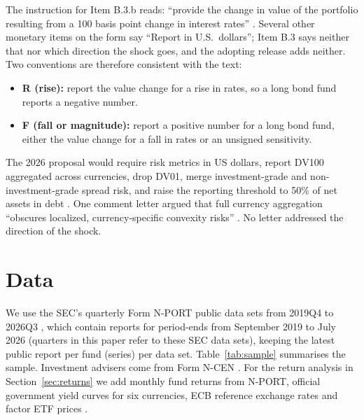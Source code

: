\documentclass[11pt]{article}
\begin{document}
The instruction for Item B.3.b reads: ``provide the change in value of the portfolio resulting from a
100 basis point change in interest rates'' \citep{sec_nport}. Several other monetary items on the form
say ``Report in U.S.\ dollars''; Item B.3 says neither that nor which direction the shock goes, and
the adopting release adds neither. Two conventions are therefore consistent with the text:
\begin{itemize}
  \item \textbf{R (rise):} report the value change for a rise in rates, so a long bond fund reports a
  negative number.
  \item \textbf{F (fall or magnitude):} report a positive number for a long bond fund, either the value
  change for a fall in rates or an unsigned sensitivity.
\end{itemize}

The 2026 proposal would require risk metrics in US dollars, report DV100 aggregated across currencies,
drop DV01, merge investment-grade and non-investment-grade spread risk, and raise the reporting
threshold to 50\% of net assets in debt \citep{sec_proposal}. One comment letter argued that full
currency aggregation ``obscures localized, currency-specific convexity risks'' \citep{sharma_letter}.
No letter addressed the direction of the shock.

\section{Data}\label{sec:data}

We use the SEC's quarterly Form N-PORT public data sets from 2019Q4 to 2026Q3 \citep{sec_nportdata}, which contain reports for period-ends from September 2019 to July 2026 (quarters in this paper refer to these SEC data sets),
keeping the latest public report per fund (series) per data set. Table~\ref{tab:sample} summarises
the sample. Investment advisers come from Form N-CEN \citep{sec_ncen}. For the return analysis in
Section~\ref{sec:returns} we add monthly fund returns from N-PORT, official government yield curves
for six currencies, ECB reference exchange rates and factor ETF prices \citep{rates}.
\end{document}
